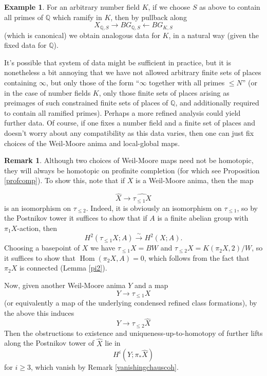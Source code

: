 \documentclass[12pt]{article}
\theoremstyle{definition}
\newtheorem{example}[theorem]{Example}
\newtheorem{remark}[theorem]{Remark}
\newcommand{\on}{\operatorname}
\newcommand{\mbb}{\mathbb}
\newcommand{\wh}{\widehat}
\begin{document}
\begin{example}
For an arbitrary number field $K$, if we choose $S$ as above to contain all primes of $\mbb{Q}$ which ramify in $K$, then by pullback along
$$X_{\mbb{Q},S} \to BG_{\mbb{Q},S} \leftarrow BG_{K,S}$$
(which is canonical) we obtain analogous data for $K$, in a natural way (given the fixed data for $\mbb{Q}$).

It's possible that system of data might be sufficient in practice, but it is nonetheless a bit annoying that we have not allowed arbitrary finite sets of places containing $\infty$, but only those of the form ``$\infty$ together with all primes $\leq N$'' (or in the case of number fields $K$, only those finite sets of places arising as preimages of such constrained finite sets of places of $\mbb{Q}$, and additionally required to contain all ramified primes).   Perhaps a more refined analysis could yield further data.  Of course, if one fixes a number field and a finite set of places and doesn't worry about any compatibility as this data varies, then one can just fix choices of the Weil-Moore anima and local-global maps.
\end{example}

\begin{remark}\label{okonprof}
Although two choices of Weil-Moore maps need not be homotopic, they will always be homotopic on profinite completion (for which see Proposition \ref{profcomp}).  To show this, note that if $X$ is a Weil-Moore anima, then the map

$$\wh{X} \to \wh{\tau_{\leq 1}X}$$
is an isomorphism on $\tau_{\leq 2}$.  Indeed, it is obviously an isomorphism on $\tau_{\leq 1}$, so by the Postnikov tower it suffices to show that if $A$ is a finite abelian group with $\pi_1X$-action, then
$$H^2(\tau_{\leq 1}X;A)\overset{\sim}{\rightarrow} H^2(X;A).$$
Choosing a basepoint of $X$ we have $\tau_{\leq 1}X=BW$ and $\tau_{\leq 2}X = K(\pi_2X,2)/W$, so it suffices to show that $\on{Hom}(\pi_2X,A)=0$, which follows from the fact that $\pi_2X$ is connected (Lemma \ref{pi2}).

Now, given another Weil-Moore anima $Y$ and a map
$$Y\to \tau_{\leq 1}X$$
(or equivalently a map of the underlying condensed refined class formations), by the above this induces
$$Y\to \tau_{\leq 2}\wh{X}$$
Then the obstructions to existence and uniqueness-up-to-homotopy of further lifts along the Postnikov tower of $\wh{X}$ lie in $$H^i(Y;\pi_{\ast}\wh{X})$$
for $i\geq 3$, which vanish by Remark \ref{vanishingchauscoh}.
\end{remark}
\end{document}
